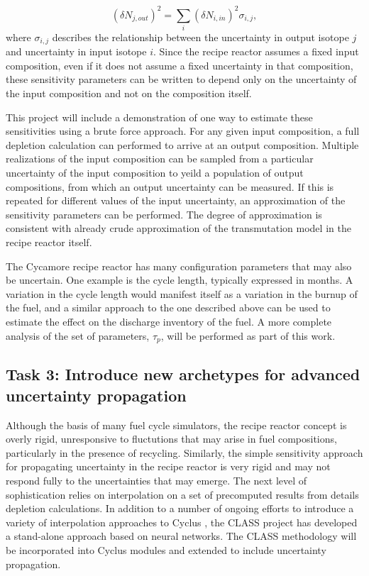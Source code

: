 \documentclass[dvips,12pt]{article}
\newcommand{\unc}[1]
{ \delta #1 }
\newcommand{\uncsq}[1]
{ \left(\unc{#1}\right)^2 }
\begin{document}
\begin{equation}
\uncsq{N_{j,out}} = \sum_i \uncsq{N_{i,in}} \sigma_{i,j},
\end{equation}
where $\sigma_{i,j}$ describes the relationship
between the uncertainty in output isotope $j$ and
uncertainty in input isotope $i$.  Since the
recipe reactor assumes a fixed input composition,
even if it does not assume a fixed uncertainty in
that composition, these sensitivity parameters can
be written to depend only on the uncertainty of
the input composition and not on the composition
itself.  

This project will include a demonstration of one
way to estimate these sensitivities using a brute
force approach.  For any given input composition,
a full depletion calculation can performed to
arrive at an output composition.  Multiple
realizations of the input composition can be
sampled from a particular uncertainty of the input
composition to yeild a population of output
compositions, from which an output uncertainty can
be measured.  If this is repeated for different
values of the input uncertainty, an approximation
of the sensitivity parameters can be performed.
The degree of approximation is consistent with
already crude approximation of the transmutation
model in the recipe reactor itself.

The Cycamore recipe reactor has many configuration
parameters that may also be uncertain.  One
example is the cycle length, typically expressed
in months.  A variation in the cycle length would
manifest itself as a variation in the burnup of
the fuel, and a similar approach to the one
described above can be used to estimate the effect
on the discharge inventory of the fuel.  A more
complete analysis of the set of parameters,
$\tau_p$, will be performed as part of this work.

\subsection{Task 3: Introduce new archetypes for advanced uncertainty propagation}

Although the basis of many fuel cycle simulators,
the recipe reactor concept is overly rigid,
unresponsive to fluctutions that may arise in fuel
compositions, particularly in the presence of
recycling.  Similarly, the simple sensitivity
approach for propagating uncertainty in the recipe
reactor is very rigid and may not respond fully to
the uncertainties that may emerge.  The next level
of sophistication relies on interpolation on a set
of precomputed results from details depletion
calculations.  In addition to a number of ongoing
efforts to introduce a variety of interpolation
approaches to Cyclus \cite{britelite, cyborg}, the
CLASS project has developed a stand-alone approach
based on neural networks\cite{CLASS}.  The CLASS
methodology will be incorporated into Cyclus
modules and extended to include uncertainty
propagation.
\end{document}
